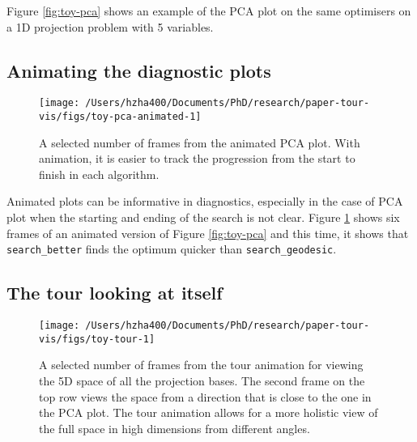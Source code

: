 Figure \ref{fig:toy-pca} shows an example of the PCA plot on the same
optimisers on a 1D projection problem with 5 variables.

\hypertarget{animating-the-diagnostic-plots}{%
\subsection{Animating the diagnostic
plots}\label{animating-the-diagnostic-plots}}

\begin{Schunk}
\begin{figure}

{\centering \texttt{[image: /Users/hzha400/Documents/PhD/research/paper-tour-vis/figs/toy-pca-animated-1]} 

}

\caption[A selected number of frames from the animated PCA plot]{A selected number of frames from the animated PCA plot. With animation, it is easier to track the progression from the start to finish in each algorithm.}\label{fig:toy-pca-animated}
\end{figure}
\end{Schunk}

Animated plots can be informative in diagnostics, especially in the case
of PCA plot when the starting and ending of the search is not clear.
Figure \ref{fig:toy-pca-animated} shows six frames of an animated
version of Figure \ref{fig:toy-pca} and this time, it shows that
\texttt{search\_better} finds the optimum quicker than
\texttt{search\_geodesic}.

\hypertarget{the-tour-looking-at-itself}{%
\subsection{The tour looking at
itself}\label{the-tour-looking-at-itself}}

\begin{Schunk}
\begin{figure}

{\centering \texttt{[image: /Users/hzha400/Documents/PhD/research/paper-tour-vis/figs/toy-tour-1]} 

}

\caption[A selected number of frames from the tour animation for viewing the 5D space of all the projection bases]{A selected number of frames from the tour animation for viewing the 5D space of all the projection bases. The second frame on the top row views the space from a direction that is close to the one in the PCA plot. The tour animation allows for a more holistic view of the full space in high dimensions from different angles.}\label{fig:toy-tour}
\end{figure}
\end{Schunk}

